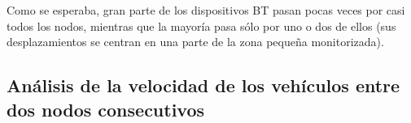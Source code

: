 \documentclass[twocolumn,twoside]{Jornadas}
\begin{document}
Como se esperaba, gran parte de los dispositivos BT pasan pocas veces por casi todos los nodos, mientras que la mayoría pasa sólo por uno o dos de ellos 
(sus desplazamientos se centran en una parte de la zona pequeña monitorizada).

 






\subsection{Análisis de la velocidad de los vehículos entre dos nodos consecutivos}
\end{document}
